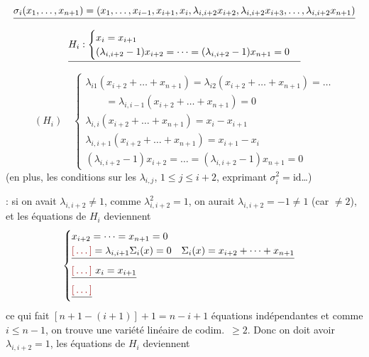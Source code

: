 \documentclass[11pt,a4paper]{article}
\begin{document}
\[
\struck{\sigma_i(x_1,\dots,x_{n+1}) = (x_1,\dots,x_{i-1},x_{i+1},x_i,\lambda_{i,i+2}x_{i+2},\lambda_{i,i+2}x_{i+3},\dots,\lambda_{i,i+2}x_{n+1})}
\]
\[
\struck{H_i : \begin{cases} x_i = x_{i+1} \\ (\lambda_{i,i+2}-1)x_{i+2} = \dots = (\lambda_{i,i+2}-1)x_{n+1} = 0 \end{cases}}
\]
\[
(H_i)\quad
\begin{cases}
\lambda_{i1}(x_{i+2}+\dots+x_{n+1}) = \lambda_{i2}(x_{i+2}+\dots+x_{n+1}) = \dots \\
\qquad = \lambda_{i,i-1}(x_{i+2}+\dots+x_{n+1}) = 0 \\
\lambda_{i,i}(x_{i+2}+\dots+x_{n+1}) = x_i-x_{i+1} \\
\lambda_{i,i+1}(x_{i+2}+\dots+x_{n+1}) = x_{i+1}-x_i \\
(\lambda_{i,i+2}-1)x_{i+2} = \dots = (\lambda_{i,i+2}-1)x_{n+1} = 0
\end{cases}
\]
(en plus, les conditions sur les $\lambda_{i,j}$, $1\leq j\leq i+2$, \struck{\ill{}} exprimant $\sigma_i^2=\mathrm{id}$\ldots)

 : si on avait $\lambda_{i,i+2}\neq 1$, comme $\lambda_{i,i+2}^2=1$, on aurait $\lambda_{i,i+2}=-1\neq 1$ (car $\neq 2$), et les équations de $H_i$ deviennent
\[
\begin{cases}
x_{i+2} = \dots = x_{n+1} = 0 \\
\struck{\ill{} = \lambda_{i,i+1}\Sigma_i(x) = 0 \quad \Sigma_i(x)=x_{i+2}+\dots+x_{n+1}} \\
\struck{\ill{}\ x_i = x_{i+1}} \\
\struck{\ill{}}
\end{cases}
\]
ce qui fait $[n+1-(i+1)]+1 = n-i+1$ équations  indépendantes et comme $i\leq n-1$, on trouve une variété linéaire de codim.~$\geq 2$. Donc on doit avoir $\lambda_{i,i+2}=1$, les équations de $H_i$ deviennent
\end{document}
